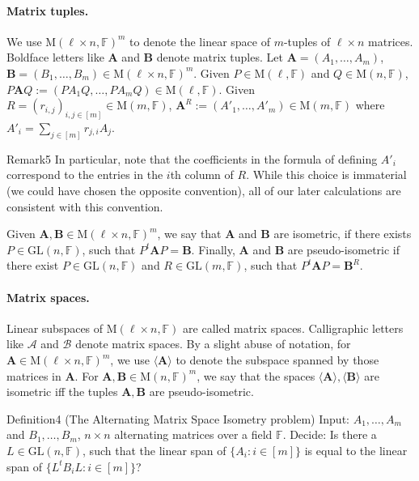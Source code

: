\paragraph{Matrix tuples.} We use $\mathrm M(\ell\times n,\mathbb F)^m$ to denote the linear space of $m$-tuples of $\ell\times n$ matrices. Boldface letters like $\mathbf A$ and $\mathbf B$ denote matrix tuples. Let $\mathbf A=(A_1,\ldots,A_m)$, $\mathbf B=(B_1,\ldots,B_m)\in\mathrm M(\ell\times n,\mathbb F)^m$. Given $P\in\mathrm M(\ell,\mathbb F)$ and $Q\in\mathrm M(n,\mathbb F)$, $P\mathbf A Q:=(PA_1Q,\ldots,PA_mQ)\in\mathrm M(\ell,\mathbb F)$. Given $R=(r_{i,j})_{i,j\in[m]}\in\mathrm M(m,\mathbb F)$, $\mathbf A^R:=(A'_1,\ldots,A'_m)\in\mathrm M(m,\mathbb F)$ where $A'_i=\sum_{j\in[m]}r_{j,i}A_j$.
\begin{authorclaim}{Remark5}
In particular, note that the coefficients in the formula of defining $A'_i$ correspond to the entries in the $i$th column of $R$. While this choice is immaterial (we could have chosen the opposite convention), all of our later calculations are consistent with this convention.
\end{authorclaim}
Given $\mathbf A,\mathbf B\in\mathrm M(\ell\times n,\mathbb F)^m$, we say that $\mathbf A$ and $\mathbf B$ are isometric, if there exists $P\in\mathrm{GL}(n,\mathbb F)$, such that $P^t\mathbf A P=\mathbf B$. Finally, $\mathbf A$ and $\mathbf B$ are pseudo-isometric if there exist $P\in\mathrm{GL}(n,\mathbb F)$ and $R\in\mathrm{GL}(m,\mathbb F)$, such that $P^t\mathbf A P=\mathbf B^R$.
\paragraph{Matrix spaces.} Linear subspaces of $\mathrm M(\ell\times n,\mathbb F)$ are called matrix spaces. Calligraphic letters like $\mathcal A$ and $\mathcal B$ denote matrix spaces. By a slight abuse of notation, for $\mathbf A\in\mathrm M(\ell\times n,\mathbb F)^m$, we use $\langle\mathbf A\rangle$ to denote the subspace spanned by those matrices in $\mathbf A$. For $\mathbf A,\mathbf B\in\mathrm M(n,\mathbb F)^m$, we say that the spaces $\langle\mathbf A\rangle,\langle\mathbf B\rangle$ are isometric iff the tuples $\mathbf A,\mathbf B$ are pseudo-isometric.
\begin{authorclaim}{Definition4 (The Alternating Matrix Space Isometry problem)}
Input: $A_1,\ldots,A_m$ and $B_1,\ldots,B_m$, $n\times n$ alternating matrices over a field $\mathbb F$.
Decide: Is there a $L\in\mathrm{GL}(n,\mathbb F)$, such that the linear span of $\{A_i:i\in[m]\}$ is equal to the linear span of $\{L^tB_iL:i\in[m]\}$?
\end{authorclaim}

